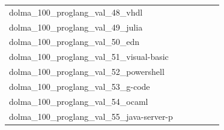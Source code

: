 \documentclass[dvipsnames]{article}
\begin{document}
\begin{appendix}
{\begin{longtable}{m{6cm}m{1.7cm}m{1.7cm}m{1.7cm}m{1.7cm}m{1.7cm}}
	dolma\_100\_proglang\_val\_48\_vhdl  & \colorbox[HTML]{82ca7d}{\makebox[\mywidth][c]{3.91}} & \colorbox[HTML]{eff8b3}{\makebox[\mywidth][c]{4.06}} & \colorbox[HTML]{ffffe5}{\makebox[\mywidth][c]{4.69}} & \colorbox[HTML]{95d284}{\makebox[\mywidth][c]{3.92}} & \colorbox[HTML]{77c578}{\makebox[\mywidth][c]{3.90}}\\
	dolma\_100\_proglang\_val\_49\_julia  & \colorbox[HTML]{77c578}{\makebox[\mywidth][c]{3.25}} & \colorbox[HTML]{dbf1a4}{\makebox[\mywidth][c]{3.36}} & \colorbox[HTML]{ffffe5}{\makebox[\mywidth][c]{4.05}} & \colorbox[HTML]{b7e193}{\makebox[\mywidth][c]{3.30}} & \colorbox[HTML]{86cc7e}{\makebox[\mywidth][c]{3.26}}\\
	dolma\_100\_proglang\_val\_50\_edn  & \colorbox[HTML]{77c578}{\makebox[\mywidth][c]{1.99}} & \colorbox[HTML]{e4f4ab}{\makebox[\mywidth][c]{2.10}} & \colorbox[HTML]{ffffe5}{\makebox[\mywidth][c]{2.67}} & \colorbox[HTML]{b7e193}{\makebox[\mywidth][c]{2.04}} & \colorbox[HTML]{b2df90}{\makebox[\mywidth][c]{2.03}}\\
	dolma\_100\_proglang\_val\_51\_visual-basic  & \colorbox[HTML]{d7efa2}{\makebox[\mywidth][c]{2.42}} & \colorbox[HTML]{fafdcd}{\makebox[\mywidth][c]{2.49}} & \colorbox[HTML]{ffffe5}{\makebox[\mywidth][c]{2.72}} & \colorbox[HTML]{77c578}{\makebox[\mywidth][c]{2.37}} & \colorbox[HTML]{7dc87b}{\makebox[\mywidth][c]{2.38}}\\
	dolma\_100\_proglang\_val\_52\_powershell  & \colorbox[HTML]{fbfdd1}{\makebox[\mywidth][c]{4.08}} & \colorbox[HTML]{fdfede}{\makebox[\mywidth][c]{4.16}} & \colorbox[HTML]{ffffe5}{\makebox[\mywidth][c]{4.50}} & \colorbox[HTML]{77c578}{\makebox[\mywidth][c]{3.86}} & \colorbox[HTML]{aadc8d}{\makebox[\mywidth][c]{3.89}}\\
	dolma\_100\_proglang\_val\_53\_g-code  & \colorbox[HTML]{77c578}{\makebox[\mywidth][c]{2.26}} & \colorbox[HTML]{fcfdd5}{\makebox[\mywidth][c]{2.66}} & \colorbox[HTML]{ffffe5}{\makebox[\mywidth][c]{3.29}} & \colorbox[HTML]{e7f5ad}{\makebox[\mywidth][c]{2.44}} & \colorbox[HTML]{cdeb9d}{\makebox[\mywidth][c]{2.37}}\\
	dolma\_100\_proglang\_val\_54\_ocaml  & \colorbox[HTML]{77c578}{\makebox[\mywidth][c]{3.06}} & \colorbox[HTML]{ecf7b1}{\makebox[\mywidth][c]{3.29}} & \colorbox[HTML]{ffffe5}{\makebox[\mywidth][c]{4.22}} & \colorbox[HTML]{cdeb9d}{\makebox[\mywidth][c]{3.19}} & \colorbox[HTML]{b0de8f}{\makebox[\mywidth][c]{3.13}}\\
	dolma\_100\_proglang\_val\_55\_java-server-p  & \colorbox[HTML]{e2f3a9}{\makebox[\mywidth][c]{2.10}} & \colorbox[HTML]{f2fab5}{\makebox[\mywidth][c]{2.11}} & \colorbox[HTML]{ffffe5}{\makebox[\mywidth][c]{2.31}} & \colorbox[HTML]{77c578}{\makebox[\mywidth][c]{2.06}} & \colorbox[HTML]{cdeb9d}{\makebox[\mywidth][c]{2.09}}\\

\end{longtable}}
\end{appendix}
\end{document}
